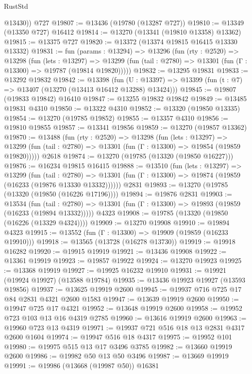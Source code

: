 \begin{lexlean}{RustStd}
\begin{coremodule}
        @13430))
    @727
@19807 := @13436 (@19780 (@13287 @727))
@19810 := @13349 (@13350 @727) @16412
@19814 := @13270 (@13341 (@19810 @13358) @13362)
@19815 := @13375 @727
@19820 := @13372 (@13374 @19815 @16415 @13330 @13332)
@19831 := fun (params : @13294) =>
  @13296
    (fun (rty : @2520) =>
    @13298
      (fun (lets : @13297) =>
      @13299 (fun (tail : @2780) => @13301 (fun (Γ : @13300) => @19787 (@19814 @19820)))))
@19832 := @13295 @19831
@19833 := @13292 @19832
@19842 := @13398
    (fun (U : @13397) => @13399 (fun (t : @7) => @13407 (@13270 (@13413 @16412 @13288) @13424)))
@19845 := @19807 (@19833 @19842) @16410
@19847 := @13255 @19832 @19842
@19849 := @13485 @19831 @4310
@19850 := @13322 @4310
@19852 := @13320 (@19850 @13335)
@19854 := @13270 (@19785 @19852)
@19855 := @13357 @4310
@19856 := @19810 @19855
@19857 := @13341 @19856
@19859 := @13270 (@19857 @13362)
@19870 := @13488
    (fun (rty : @2520) =>
    @13298
      (fun (lets : @13297) =>
      @13299 (fun (tail : @2780) => @13301 (fun (Γ : @13300) => @19854 (@19859 @19820)))))
    @2618
@19874 := @13270 (@19785 (@13320 (@19850 @16227)))
@19876 := @16234 @19815 @16415
@19888 := @13510
    (fun (lets : @13297) =>
    @13299
      (fun (tail : @2780) =>
      @13301 (fun (Γ : @13300) => @19874 (@19859 (@16233 (@19876 @13330 @13332))))))
    @2831
@19893 := @13270 (@19785 (@13320 (@19850 (@16226 @17196))))
@19894 := @19876 @2831
@19903 := @13534
    (fun (tail : @2780) => @13301 (fun (Γ : @13300) => @19893 (@19859 (@16233 (@19894 @13332)))))
    @4323
@19908 := @19785 (@13320 (@19850 (@16226 (@13329 @4324))))
@19909 := @13270 @19908
@19910 := @19894 @4323
@19915 := @13552 (fun (Γ : @13300) => @19909 (@19859 (@16233 @19910)))
@19918 := @13565 (@13728 (@16278 @13730))
@19919 := @19918 @16282
@19920 := @19915 @19919
@19921 := @13436 @19908
@19922 := @13361 @19919
@19923 := @19857 @19922
@19924 := @13270 @19923
@19925 := @13368 @19919
@19927 := @19925 @16232 @19910
@19931 := @19921 (@19924 @19927) (@13588 @19784)
@19935 := @13436 @19923 @19927 (@13593 @19856)
@19937 := @13625 @19919 @2600
@19945 := @19937 @716 @725 @17 @84 @2831 @4321 @2600 @1583
@19947 := @13639 @19919 @2600
@19950 := @19947 @725 @17 @4321
@19952 := @13648 @19919 @2600
@19958 := @19952 @723 @103 @13 @16 @4319 @2785
@19960 := @13616 @19919 @2600
@19963 := @19960 @723 @13 @4319
@19971 := @19937 @721 @516 @18 @13 @2831 @4317 @2600 @1604
@19974 := @19947 @516 @18 @4317
@19975 := @19952 @101
@19980 := @19975 @515 @13 @17 @3496 @3785
@19982 := @13660 @19919 @2600
@19986 := @19982 @50 @13 @50 @3496
@19987 := @13669 @19919
@19991 := @19986 (@13668 (@19987 @50)) @16381

\end{coremodule}
\end{lexlean}

